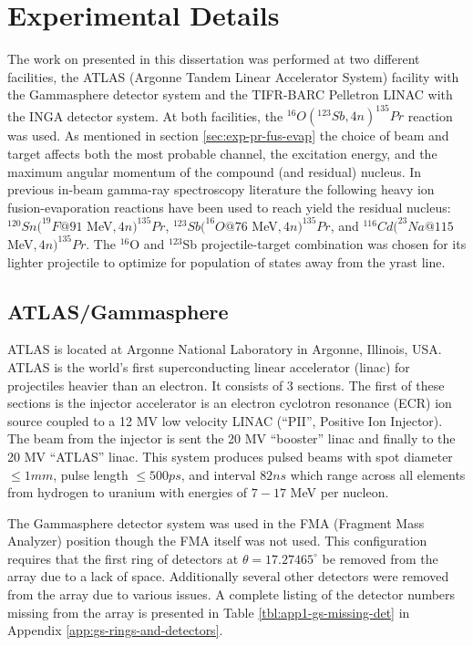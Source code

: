 \section{Experimental Details}
\label{sec:exp-pr-details}
The work on \pr{} presented in this dissertation was performed at two different facilities, the ATLAS (Argonne Tandem Linear Accelerator System) facility with the Gammasphere detector system and the TIFR-BARC Pelletron LINAC with the INGA detector system. At both facilities, the $^{16}O(^{123}Sb,4n)^{135}Pr$ reaction was used. As mentioned in section \ref{sec:exp-pr-fus-evap} the choice of beam and target affects both the most probable channel, the excitation energy, and the maximum angular momentum of the compound (and residual) nucleus. In previous in-beam gamma-ray spectroscopy literature the following heavy ion fusion-evaporation reactions have been used to reach yield the \pr{} residual nucleus: $^{120}Sn(^{19}F @ 91$ MeV$, 4n)^{135}Pr$\cite{semkow135Pr}, $^{123}Sb(^{16}O @ 76$ MeV$,4n)^{135}Pr$\cite{135PrLifetimes}, and  $^{116}Cd(^{23}Na @ 115$ MeV$,4n)^{135}Pr$\cite{ePaul135Pr}. The $^{16}$O and $^{123}$Sb projectile-target combination was chosen for its lighter projectile to optimize for population of states away from the yrast line.

\subsection{ATLAS/Gammasphere}
\label{ssec:exp-pr-details-gs}
ATLAS is located at Argonne National Laboratory in Argonne, Illinois, USA. ATLAS is the world's first superconducting linear accelerator (linac) for projectiles heavier than an electron. It consists of 3 sections. The first of these sections is the injector accelerator is an electron cyclotron resonance (ECR) ion source coupled to a 12 MV low velocity LINAC (``PII'', Positive Ion Injector). The beam from the injector is sent the 20 MV ``booster'' linac and finally to the 20 MV ``ATLAS'' linac. This system produces pulsed beams with spot diameter $\leq1mm$, pulse length $\leq500ps$, and interval $82ns$ which range across all elements from hydrogen to uranium with energies of $7-17$ MeV per nucleon.

The Gammasphere detector system was used in the FMA (Fragment Mass Analyzer) position though the FMA itself was not used. This configuration requires that the first ring of detectors at $\theta{}=17.27465^{\circ}$ be removed from the array due to a lack of space. Additionally several other detectors were removed from the array due to various issues. A complete listing of the detector numbers missing from the array is presented in Table \ref{tbl:app1-gs-missing-det} in Appendix \ref{app:gs-rings-and-detectors}.

